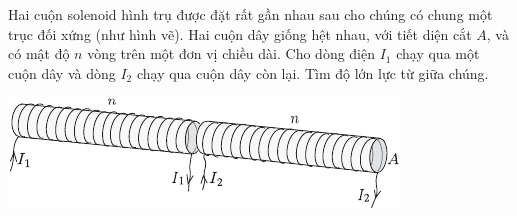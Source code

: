 \begin{vd}
Hai cuộn solenoid hình trụ được đặt rất gần nhau sau cho chúng có chung một trục đối xứng (như hình vẽ). Hai cuộn dây giống hệt nhau, với tiết diện cắt $A$, và có mật độ $n$ vòng trên một đơn vị chiều dài. Cho dòng điện $I_1$ chạy qua một cuộn dây và dòng $I_2$ chạy qua cuộn dây còn lại. Tìm độ lớn lực từ giữa chúng.
\begin{center}
\includegraphics[scale=1.5]{Anh/Nam1.pdf}
\end{center}
\end{vd}
